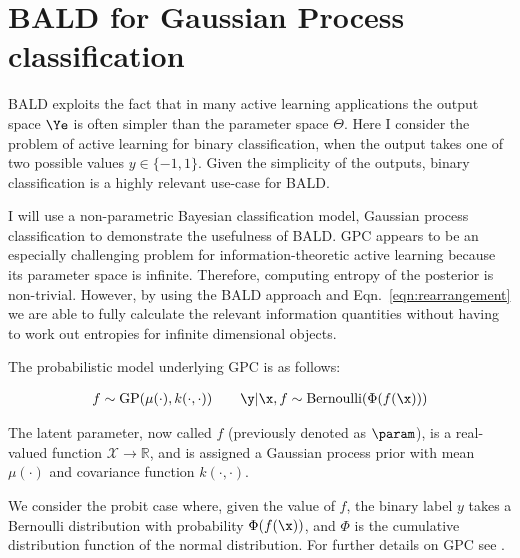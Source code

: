 
\section{BALD for Gaussian Process classification}

BALD exploits the fact that in many active learning applications the output space $\Ye$ is often simpler than the parameter space $\Theta$. Here I consider the problem of active learning for binary classification, when the output takes one of two possible values $y \in \{-1,1\}$. Given the simplicity of the outputs, binary classification is a highly relevant use-case for BALD.

I will use a non-parametric Bayesian classification model, Gaussian process classification \citep[GPC,][]{Rasmussen2006} to demonstrate the usefulness of BALD. GPC appears to be an especially challenging problem for information-theoretic active learning because its parameter space is infinite. Therefore, computing entropy of the posterior is non-trivial. However, by using the BALD approach and Eqn.\ \eqref{eqn:rearrangement} we are able to fully calculate the relevant information quantities without having to work out entropies for infinite dimensional objects. 


The probabilistic model underlying GPC is as follows:

\begin{align}
	f \sim \mathrm{GP}(\mu(\cdot),k(\cdot,\cdot)) \qquad \y\vert\x,f \sim\mathrm{Bernoulli}(\Phi(f(\x))) \label{eqn:GPC_model}
\end{align}

The latent parameter, now called $f$ (previously denoted as $\param$), is a real-valued function $\mathcal{X}\rightarrow\mathbb{R}$, and is assigned a Gaussian process prior with mean $\mu(\cdot)$ and covariance function $k(\cdot,\cdot)$.

We consider the probit case where, given the value of $f$, the binary label $y$ takes a Bernoulli distribution with probability $\Phi(f(\x))$, and $\Phi$ is the cumulative distribution function of the normal distribution. For further details on GPC see \citep{Rasmussen2006}.


